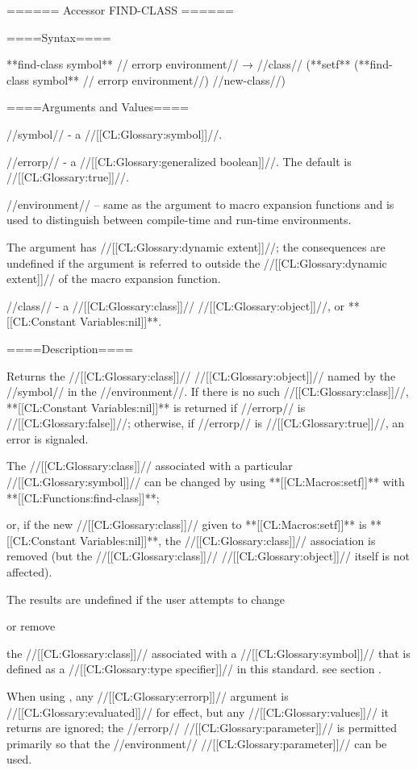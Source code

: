 ====== Accessor FIND-CLASS ======

====Syntax====

**find-class {symbol** //\opt} errorp environment// → //class// (**setf** (**find-class {symbol** //\opt} errorp environment//) //new-class//)

====Arguments and Values====

//symbol// - a //[[CL:Glossary:symbol]]//.

//errorp// - a //[[CL:Glossary:generalized boolean]]//. The default is //[[CL:Glossary:true]]//.

//environment// -- same as the  argument to macro expansion functions and is used to distinguish between compile-time and run-time environments.

The  argument has //[[CL:Glossary:dynamic extent]]//; the consequences are undefined if the  argument is referred to outside the //[[CL:Glossary:dynamic extent]]// of the macro expansion function.


//class// - a //[[CL:Glossary:class]]// //[[CL:Glossary:object]]//, or **[[CL:Constant Variables:nil]]**.

====Description====

Returns the //[[CL:Glossary:class]]// //[[CL:Glossary:object]]// named by the //symbol// in the //environment//. If there is no such //[[CL:Glossary:class]]//, **[[CL:Constant Variables:nil]]** is returned if //errorp// is //[[CL:Glossary:false]]//; otherwise, if //errorp// is //[[CL:Glossary:true]]//, an error is signaled.

The //[[CL:Glossary:class]]// associated with a particular //[[CL:Glossary:symbol]]// can be changed by using **[[CL:Macros:setf]]** with **[[CL:Functions:find-class]]**;

or, if the new //[[CL:Glossary:class]]// given to **[[CL:Macros:setf]]** is **[[CL:Constant Variables:nil]]**, the //[[CL:Glossary:class]]// association is removed (but the //[[CL:Glossary:class]]// //[[CL:Glossary:object]]// itself is not affected).

The results are undefined if the user attempts to change

or remove

the //[[CL:Glossary:class]]// associated with a //[[CL:Glossary:symbol]]// that is defined as a //[[CL:Glossary:type specifier]]// in this standard. see section {\secref\IntegratingTypesAndClasses}.

When using , any //[[CL:Glossary:errorp]]// argument is //[[CL:Glossary:evaluated]]// for effect, but any //[[CL:Glossary:values]]// it returns are ignored; the //errorp// //[[CL:Glossary:parameter]]// is permitted primarily so that the //environment// //[[CL:Glossary:parameter]]// can be used.

